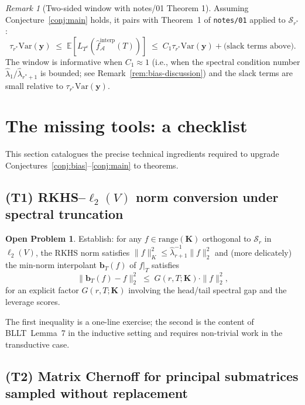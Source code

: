 \documentclass[11pt,a4paper]{article}
\theoremstyle{plain}
\theoremstyle{definition}
\newtheorem{problem}[theorem]{Open Problem}
\theoremstyle{remark}
\newtheorem{remark}[theorem]{Remark}
\newcommand{\by}{\mathbf{y}}
\newcommand{\bK}{\mathbf{K}}
\newcommand{\bb}{\mathbf{b}}
\newcommand{\E}{\mathbb{E}}
\newcommand{\Var}{\mathrm{Var}}
\newcommand{\Scal}{\mathcal{S}}
\newcommand{\Acal}{\mathcal{A}}
\newcommand{\range}{\mathrm{range}}
\begin{document}
\begin{remark}[Two-sided window with notes/01 Theorem 1]
\label{rem:window}
Assuming Conjecture~\ref{conj:main} holds, it pairs with
Theorem~1 of \texttt{notes/01} applied to $\Scal_{r^*}$:
\begin{equation*}
    \tau_{r^*}\Var(\by)
    \;\le\; \E[L_{T^c}(\hat f^{\mathrm{interp}}_\Acal(T))]
    \;\le\; C_1\tau_{r^*}\Var(\by) + \text{(slack terms above)}.
\end{equation*}
The window is informative when $C_1 \approx 1$ (i.e., when the
spectral condition number $\hat\lambda_1/\hat\lambda_{r^*+1}$ is
bounded; see Remark~\ref{rem:bias-discussion}) and the slack terms
are small relative to $\tau_{r^*}\Var(\by)$.
\end{remark}

\section{The missing tools: a checklist}
\label{sec:tools}

This section catalogues the precise technical ingredients required
to upgrade Conjectures~\ref{conj:bias}--\ref{conj:main} to theorems.

\subsection{(T1) RKHS--$\ell_2(V)$ norm conversion under spectral
truncation}

\begin{problem}
\label{prob:norm-conv}
Establish: for any $f \in \range(\bK)$ orthogonal to $\Scal_r$ in
$\ell_2(V)$, the RKHS norm satisfies
$\|f\|_K^2 \le \hat\lambda_{r+1}^{-1}\|f\|_2^2$ and (more
delicately) the min-norm interpolant $\bb_T(f)$ of $f|_T$ satisfies
\begin{equation*}
    \|\bb_T(f) - f\|_2^2 \;\le\; G(r, T; \bK) \cdot \|f\|_2^2,
\end{equation*}
for an explicit factor $G(r, T; \bK)$ involving the head/tail
spectral gap and the leverage scores.
\end{problem}

The first inequality is a one-line exercise; the second is the
content of BLLT~Lemma~7 in the inductive setting and requires
non-trivial work in the transductive case.

\subsection{(T2) Matrix Chernoff for principal submatrices sampled
without replacement}
\end{document}
